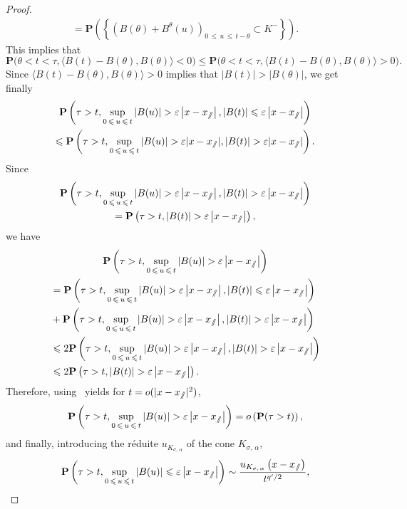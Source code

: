 \documentclass[10pt]{amsart}
\theoremstyle{definition}\newtheorem{defi}[theo]{Definition}\newtheorem{rema}[theo]{Remark}\newtheorem{exam}[theo]{Example}\newtheorem{exem}[theo]{Example}\newtheorem{nota}[theo]{Notation}
\newcommand{\pr}{\mathbf{P}}
\renewcommand{\epsilon}{\varepsilon}
\renewcommand{\leq}{\leqslant}
\newcommand{\sslash}{\slash\mkern-6.4mu\slash}
\begin{document}
\begin{proof}
\begin{multline*}
=\pr\left(\left\{ \left(B(\theta)+B^{\theta}(u)\right)_{0\,\leq\,u\,\leq\,t-\theta}\subset K^{-}\right\}\right).
\end{multline*}
This implies that
\[
\pr\big(\theta<t<\tau, \big\langle B(t)-B(\theta),B(\theta)\big\rangle<0\big)\leq \pr\big(\theta<t<\tau, \big\langle B(t)-B(\theta),B(\theta)\big\rangle>0\big).
\]
Since $\langle B(t)-B(\theta),B(\theta)\rangle>0$ implies that $| B(t)|>| B(\theta)|$, we get finally
\begin{multline*}
\pr\left(\tau>t, \sup_{0\,\leq\,u\,\leq\,t}|B(u)|> \epsilon \left|x-x_{\sslash}\right|, |B(t)| \leq \epsilon \left|x-x_{\sslash}\right|\right)\\
\leq \pr\left(\tau>t, \sup_{0\,\leq\,u\,\leq\,t}| B(u)|> \epsilon | x-x_{\sslash}|, | B(t)| > \epsilon | x-x_{\sslash}|\right).
\end{multline*}
Since
\begin{multline*}
\pr\left(\tau>t, \sup_{0\,\leq\,u\,\leq\,t}|B(u)|> \epsilon \left|x-x_{\sslash}\right|, |B(t)| > \epsilon \left|x-x_{\sslash}\right|\right)\\
= \pr\left(\tau>t, |B(t)| > \epsilon \left|x-x_{\sslash}\right|\right),
\end{multline*}
we have
\begin{multline*}
\pr\left(\tau>t, \sup_{0\,\leq\,u\,\leq\,t}|B(u)|> \epsilon \left|x-x_{\sslash}\right|\right)\\
\begin{aligned}
&=\pr\left(\tau>t, \sup_{0\,\leq\,u\,\leq\,t}| B(u)|> \epsilon \left|x-x_{\sslash}\right|, | B(t)|\leq \epsilon \left|x-x_{\sslash}\right|\right)\\
&+\pr\left(\tau>t, \sup_{0\,\leq\,u\,\leq\,t}| B(u)|> \epsilon \left|x-x_{\sslash}\right|, | B(t)| > \epsilon \left|x-x_{\sslash}\right|\right)\\
&\leq 2\pr\left(\tau>t, \sup_{0\,\leq\,u\,\leq\,t}| B(u)|> \epsilon \left|x-x_{\sslash}\right|, |B(t)| > \epsilon \left|x-x_{\sslash}\right|\right)\\
&\leq 2\pr\left(\tau>t,|B(t)| > \epsilon \left|x-x_{\sslash}\right|\right).
\end{aligned}
\end{multline*}
Therefore, using~\cite[Lemma~18]{DeWa-15} yields for $t=o(|x-x_{\sslash}|^{2})$,
\[
\pr\left(\tau>t, \sup_{0\,\leq\,u\,\leq\,t}|B(u)|> \epsilon \left|x-x_{\sslash}\right|\right)=o\left(\pr(\tau>t)\right),
\]
and finally, introducing the réduite $u_{K_{\sigma,\,\alpha}}$ of the cone $K_{\sigma,\,\alpha}$,
\[
\pr\left(\tau>t, \sup_{0\,\leq\,u\,\leq\,t}| B(u)|\leq \epsilon \left|x-x_{\sslash}\right|\right)\sim \frac{u_{K_{\sigma,\,\alpha}}\left(x-x_{\sslash}\right)}{t^{q'/2}},
\]
\end{proof}
\end{document}
